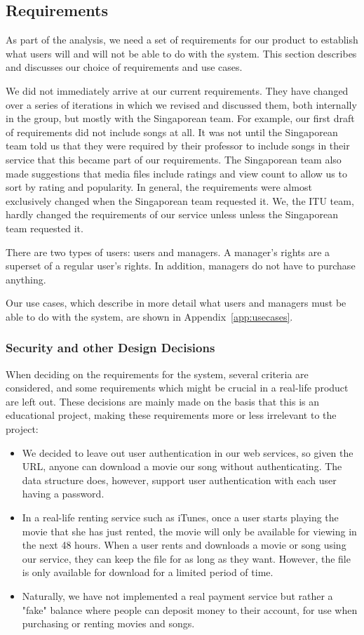 \subsection{Requirements}
As part of the analysis, we need a set of requirements for our product to establish what users will and will not be able to do with the system. This section describes and discusses our choice of requirements and use cases.


We did not immediately arrive at our current requirements. They have changed over a series of iterations in which we revised and discussed them, both internally in the group, but mostly with the Singaporean team. 
For example, our first draft of requirements did not include songs at all. It was not until the Singaporean team told us that they were required by their professor to include songs in their service that this became part of our requirements. The Singaporean team also made suggestions that media files include ratings and view count to allow us to sort by rating and popularity. In general, the requirements were almost exclusively changed when the Singaporean team requested it. We, the ITU team, hardly changed the requirements of our service unless unless the Singaporean team requested it.


There are two types of users: users and managers. A manager’s rights are a superset of a regular user’s rights. In addition, managers do not have to purchase anything.


Our use cases, which describe in more detail what users and managers must be able to do with the system, are shown in Appendix~\ref{app:usecases}.

\subsubsection{Security and other Design Decisions}
When deciding on the requirements for the system, several criteria are considered, and some requirements which might be crucial in a real-life product are left out. These decisions are mainly made on the basis that this is an educational project, making these requirements more or less irrelevant to the project:
\begin{itemize}
\item We decided to leave out user authentication in our web services, so given the URL, anyone can download a movie our song without authenticating. The data structure does, however, support user authentication with each user having a password.
\item In a real-life renting service such as iTunes, once a user starts playing the movie that she has just rented, the movie will only be available for viewing in the next 48 hours. When a user rents and downloads a movie or song using our service, they can keep the file for as long as they want. However, the file is only available for download for a limited period of time.
\item Naturally, we have not implemented a real payment service but rather a "fake" balance where people can deposit money to their account, for use when purchasing or renting movies and songs.
\end{itemize}